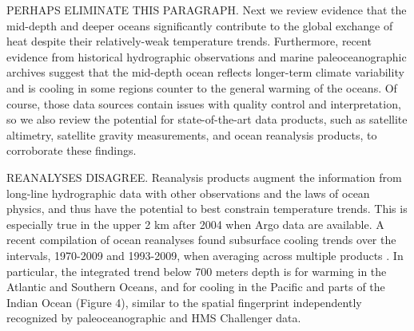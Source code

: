 \documentclass[authoryear,round,12pt]{article}
\begin{document}
PERHAPS ELIMINATE THIS PARAGRAPH.
Next we review evidence that the mid-depth and deeper oceans
significantly contribute to the global exchange of heat despite their
relatively-weak temperature trends. Furthermore, recent evidence from
historical hydrographic observations and marine paleoceanographic
archives suggest that the mid-depth ocean reflects longer-term climate
variability and is cooling in some regions counter to the general
warming of the oceans. Of course, those data sources contain issues
with quality control and interpretation, so we also review the
potential for state-of-the-art data products, such as satellite
altimetry, satellite gravity measurements, and ocean reanalysis
products, to corroborate these findings.

   



REANALYSES DISAGREE.  Reanalysis products augment the information from
long-line hydrographic data with other observations and the laws of
ocean physics, and thus have the potential to best constrain
temperature trends. This is especially true in the upper 2 km after
2004 when Argo data are available. A recent compilation of ocean
reanalyses found subsurface cooling trends over the intervals,
1970-2009 and 1993-2009, when averaging across multiple products
\citep{Palmer-Roberts-2017:Ocean}. In particular, the integrated trend
below 700 meters depth is for warming in the Atlantic and Southern
Oceans, and for cooling in the Pacific and parts of the Indian Ocean
(Figure 4), similar to the spatial fingerprint independently
recognized by paleoceanographic and HMS Challenger data.

\end{document}
